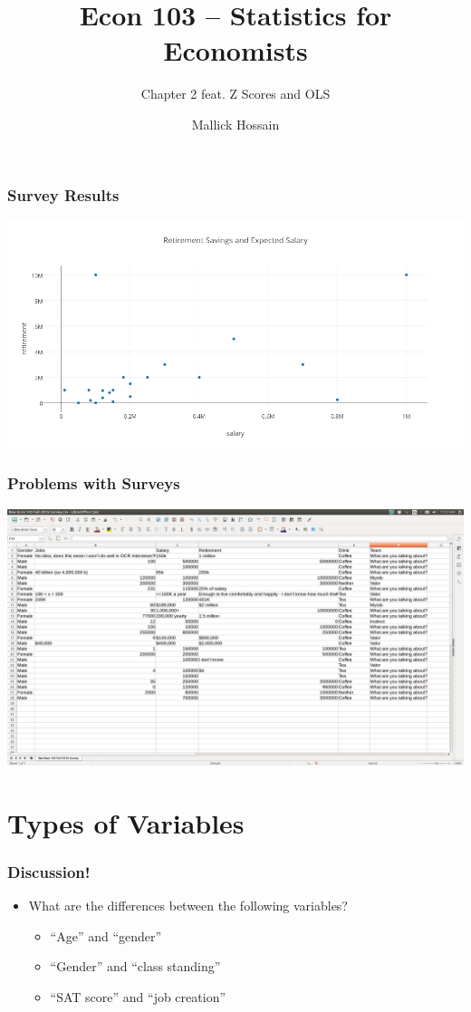 \documentclass{beamer}
\title{Econ 103 -- Statistics for Economists}
\subtitle{Chapter 2 feat. Z Scores and OLS}
\author{Mallick Hossain}
\date{}
\institute{University of Pennsylvania}
\begin{document}
\begin{frame}
	\titlepage 
\end{frame} 

\begin{frame}
\frametitle{Survey Results}
	\includegraphics[scale=0.3]{./images/classSurvey.png}
\end{frame} 

\begin{frame}
\frametitle{Problems with Surveys}
	\includegraphics[scale=0.15]{./images/surveyTable.png}
\end{frame} 

\section{Types of Variables}
\begin{frame}
\frametitle{Discussion!}
	\begin{itemize}
		\item What are the differences between the following variables?
		\begin{itemize}
			\item ``Age'' and ``gender''
			\item ``Gender'' and ``class standing''
			\item ``SAT score'' and ``job creation''
		\end{itemize}
	\end{itemize}
\end{frame} 
\end{document}
